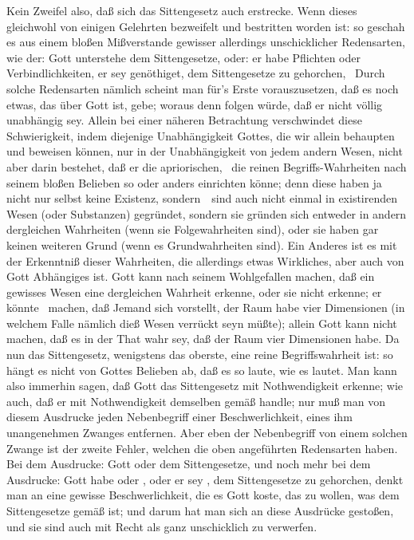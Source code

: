 \begin{aufza}
\item Kein Zweifel also, daß sich das Sittengesetz auch  erstrecke. Wenn dieses gleichwohl von einigen Gelehrten bezweifelt und bestritten worden ist: so geschah es aus einem bloßen Mißverstande gewisser allerdings unschicklicher Redensarten, wie der: Gott unterstehe dem Sittengesetze, oder: er habe Pflichten oder Verbindlichkeiten, er sey genöthiget, dem Sittengesetze zu gehorchen, \udgl\  Durch solche Redensarten nämlich scheint man für's Erste vorauszusetzen, daß es noch etwas, das über Gott ist, gebe; woraus denn folgen würde, daß er nicht völlig unabhängig sey. Allein bei einer näheren Betrachtung verschwindet diese Schwierigkeit, indem diejenige Unabhängigkeit Gottes, die wir allein behaupten und beweisen können, nur in der Unabhängigkeit von jedem andern Wesen, nicht aber darin bestehet, daß er die apriorischen, \dh\ die reinen Begriffs-Wahrheiten nach seinem bloßen Belieben so oder anders einrichten könne; denn diese haben ja nicht nur selbst keine Existenz, sondern~\ sind auch nicht einmal in existirenden Wesen (oder Substanzen) gegründet, sondern sie gründen sich entweder in andern dergleichen Wahrheiten (wenn sie Folgewahrheiten sind), oder sie haben gar keinen weiteren Grund (wenn es Grundwahrheiten sind). Ein Anderes ist es mit der Erkenntniß dieser Wahrheiten, die allerdings etwas Wirkliches, aber auch von Gott Abhängiges ist. Gott kann nach seinem Wohlgefallen machen, daß ein gewisses Wesen eine dergleichen Wahrheit erkenne, oder sie nicht erkenne; er könnte \zB\ machen, daß Jemand sich vorstellt, der Raum habe vier Dimensionen (in welchem Falle nämlich dieß Wesen verrückt seyn müßte); allein Gott kann nicht machen, daß es in der That wahr sey, daß der Raum vier Dimensionen habe. Da nun das Sittengesetz, wenigstens das oberste, eine reine Begriffswahrheit ist: so hängt es nicht von Gottes Belieben ab, daß es so laute, wie es lautet. Man kann also immerhin sagen, daß Gott das Sittengesetz mit Nothwendigkeit erkenne; wie auch, daß er mit Nothwendigkeit demselben gemäß handle; nur muß man von diesem Ausdrucke jeden Nebenbegriff einer Beschwerlichkeit, eines ihm unangenehmen Zwanges entfernen. Aber eben der Nebenbegriff von einem solchen Zwange ist der zweite Fehler, welchen die oben angeführten Redensarten haben. Bei dem Ausdrucke: Gott  oder  dem Sittengesetze, und noch mehr bei dem Ausdrucke: Gott habe  oder , oder er sey , dem Sittengesetze zu gehorchen, denkt man an eine gewisse Beschwerlichkeit, die es Gott koste, das zu wollen, was dem Sittengesetze gemäß ist; und darum hat man sich an diese Ausdrücke gestoßen, und sie sind auch mit Recht als ganz unschicklich zu verwerfen.

\end{aufza}
